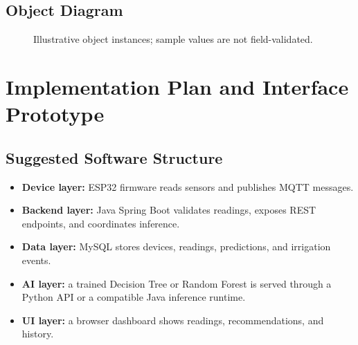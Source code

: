 \documentclass[12pt,a4paper]{report}
\begin{document}
\section{Object Diagram}
\begin{figure}[htbp]
\centering
{}
\caption{Illustrative object instances; sample values are not field-validated.}
\end{figure}
\chapter{Implementation Plan and Interface Prototype}

\section{Suggested Software Structure}

\begin{itemize}[leftmargin=*]

\item \textbf{Device layer:} ESP32 firmware reads sensors and publishes MQTT messages.

\item \textbf{Backend layer:} Java Spring Boot validates readings, exposes REST endpoints, and coordinates inference.

\item \textbf{Data layer:} MySQL stores devices, readings, predictions, and irrigation events.

\item \textbf{AI layer:} a trained Decision Tree or Random Forest is served through a Python API or a compatible Java inference runtime.

\item \textbf{UI layer:} a browser dashboard shows readings, recommendations, and history.

\end{itemize}
\end{document}
